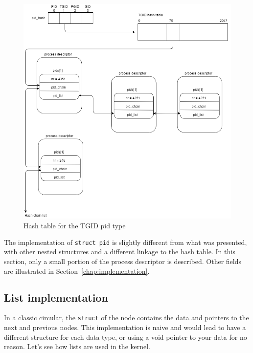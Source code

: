 \begin{figure}[ht]
\includegraphics[width=\textwidth]{images/pidhash2}
\caption{Hash table for the TGID pid type}
\label{img:pidhash2}
\end{figure}
The implementation of \verb|struct pid| is slightly different from what was presented, with other nested structures and a different linkage to the hash table. %
In this section, only a small portion of the process descriptor is described. Other fields are illustrated in Section~\ref{chap:implementation}.



\subsection{List implementation}
In a classic circular, the \texttt{struct} of the node contains the data and pointers to the next and previous nodes. This implementation is naive and would lead to have a different structure for each data type, or using a void pointer to your data for no reason. Let's see how lists are used in the kernel.

